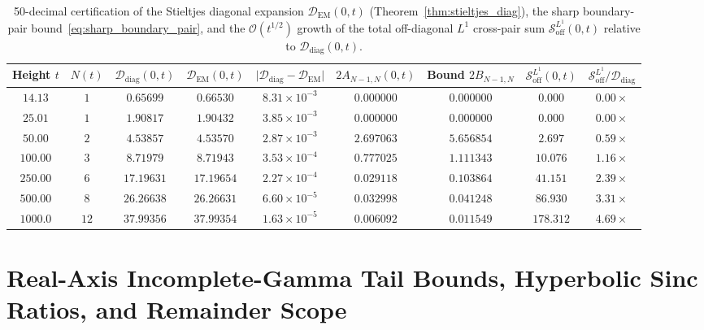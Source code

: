 \documentclass[11pt,reqno]{amsart}
\theoremstyle{definition}
\theoremstyle{remark}
\numberwithin{equation}{section}
\begin{document}
\begin{table}[t]
\centering
\caption{50-decimal certification of the Stieltjes diagonal expansion $\mathcal{D}_{\mathrm{EM}}(0,t)$ (Theorem~\ref{thm:stieltjes_diag}), the sharp boundary-pair bound~\eqref{eq:sharp_boundary_pair}, and the $\mathcal{O}(t^{1/2})$ growth of the total off-diagonal $L^1$ cross-pair sum $\mathcal{S}_{\mathrm{off}}^{L^1}(0,t)$ relative to $\mathcal{D}_{\mathrm{diag}}(0,t)$.}\label{tab:stieltjes_offdiag}
\scriptsize
\setlength{\tabcolsep}{3.0pt}
\begin{tabular}{@{}ccccccccc@{}}
\toprule
Height $t$ & $N(t)$ & $\mathcal{D}_{\mathrm{diag}}(0,t)$ & $\mathcal{D}_{\mathrm{EM}}(0,t)$ & $\lvert\mathcal{D}_{\mathrm{diag}} - \mathcal{D}_{\mathrm{EM}}\rvert$ & $2A_{N-1,N}(0,t)$ & Bound $2B_{N-1,N}$ & $\mathcal{S}_{\mathrm{off}}^{L^1}(0,t)$ & $\mathcal{S}_{\mathrm{off}}^{L^1}/\mathcal{D}_{\mathrm{diag}}$ \\
\midrule
$14.13$  & $1$  & $0.65699$  & $0.66530$  & $8.31 \times 10^{-3}$ & $0.000000$ & $0.000000$ & $0.000$   & $0.00\times$ \\
$25.01$  & $1$  & $1.90817$  & $1.90432$  & $3.85 \times 10^{-3}$ & $0.000000$ & $0.000000$ & $0.000$   & $0.00\times$ \\
$50.00$  & $2$  & $4.53857$  & $4.53570$  & $2.87 \times 10^{-3}$ & $2.697063$ & $5.656854$ & $2.697$   & $0.59\times$ \\
$100.00$ & $3$  & $8.71979$  & $8.71943$  & $3.53 \times 10^{-4}$ & $0.777025$ & $1.111343$ & $10.076$  & $1.16\times$ \\
$250.00$ & $6$  & $17.19631$ & $17.19654$ & $2.27 \times 10^{-4}$ & $0.029118$ & $0.103864$ & $41.151$  & $2.39\times$ \\
$500.00$ & $8$  & $26.26638$ & $26.26631$ & $6.60 \times 10^{-5}$ & $0.032998$ & $0.041248$ & $86.930$  & $3.31\times$ \\
$1000.0$ & $12$ & $37.99356$ & $37.99354$ & $1.63 \times 10^{-5}$ & $0.006092$ & $0.011549$ & $178.312$ & $4.69\times$ \\
\bottomrule
\end{tabular}
\end{table}

\section{Real-Axis Incomplete-Gamma Tail Bounds, Hyperbolic Sinc Ratios, and Remainder Scope}\label{sec:tails}
\end{document}
